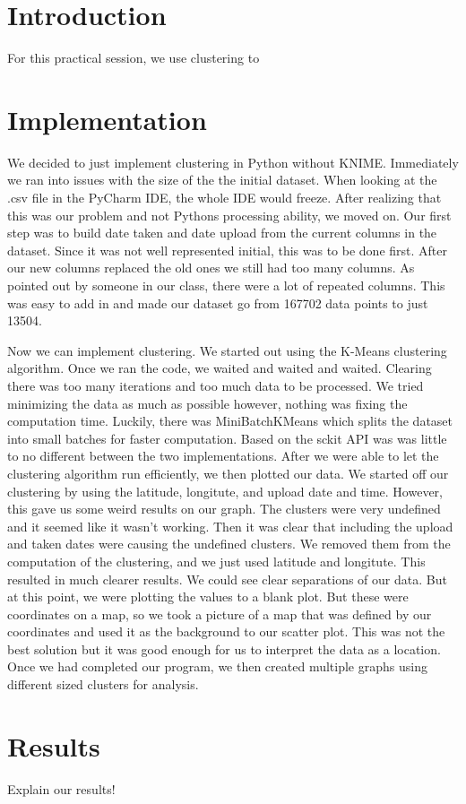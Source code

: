 \documentclass{article}
\begin{document}
\section*{Introduction}
For this practical session, we use clustering to 


\section*{Implementation}
\par
We decided to just implement clustering in Python without KNIME. Immediately we ran into issues with the size of the the initial dataset.
When looking at the .csv file in the PyCharm IDE, the whole IDE would freeze. After realizing that this was our problem and not Pythons processing 
ability, we moved on. Our first step was to build date taken and date upload from the current columns in the dataset. Since it was not well 
represented initial, this was to be done first. After our new columns replaced the old ones we still had too many columns. As pointed out 
by someone in our class, there were a lot of repeated columns. This was easy to add in and made our dataset go from 167702 
data points to just 13504. 
\par 
Now we can implement clustering. We started out using the K-Means clustering algorithm. Once we ran the code, we waited and waited and waited.
Clearing there was too many iterations and too much data to be processed. We tried minimizing the data as much as possible however, nothing
was fixing the computation time. Luckily, there was MiniBatchKMeans which splits the dataset into small batches for faster computation. 
Based on the sckit API was was little to no different between the two implementations. After we were able to let the 
clustering algorithm run efficiently, we then plotted our data. We started off our clustering by using the latitude, longitute, and upload date and time. 
However, this gave us some weird results on our graph. The clusters were very undefined and it seemed like it wasn't working. Then it was
clear that including the upload and taken dates were causing the undefined clusters. We removed them from the computation of the clustering, and 
we just used latitude and longitute. This resulted in much clearer results. We could see clear separations of our data. But at this point, 
we were plotting the values to a blank plot. But these were coordinates on a map, so we took a picture of a map that was defined by our coordinates
and used it as the background to our scatter plot. This was not the best solution but it was good enough for us to interpret the data as a location. 
Once we had completed our program, we then created multiple graphs using different sized clusters for analysis. 


\section*{Results}
Explain our results!
\end{document}

